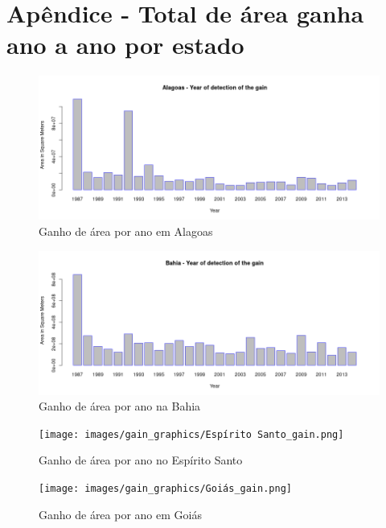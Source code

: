 \section{Apêndice - Total de área ganha ano a ano por estado}

\begin{figure}[H]
    \centering
    \includegraphics[scale=.5]{images/gain_graphics/Alagoas_gain.png}
    \caption{Ganho de área por ano em Alagoas}
    \label{fig:gain_alagoas}
\end{figure}

\begin{figure}[H]
    \centering
    \includegraphics[scale=.5]{images/gain_graphics/Bahia_gain.png}
    \caption{Ganho de área por ano na Bahia}
    \label{fig:gain_bahia}
\end{figure}

\begin{figure}[H]
    \centering
    \texttt{[image: images/gain\_graphics/Espírito Santo\_gain.png]}
    \caption{Ganho de área por ano no Espírito Santo}
    \label{fig:gain_espirito_santo}
\end{figure}

\begin{figure}[H]
    \centering
    \texttt{[image: images/gain\_graphics/Goiás\_gain.png]}
    \caption{Ganho de área por ano em Goiás}
    \label{fig:gain_goias}
\end{figure}

